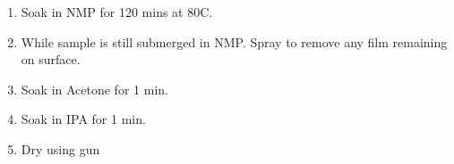 \begin{enumerate}
\begin{enumerate}
        \begin{enumerate}
            \item Soak in NMP for 120 mins at 80\degree C.
            \item While sample is still submerged in NMP. Spray to remove any film remaining on surface.
            \item Soak in Acetone for 1 min.
            \item Soak in IPA for 1 min.
            \item Dry using  gun
        \end{enumerate}
    \end{enumerate}
    
\end{enumerate}

